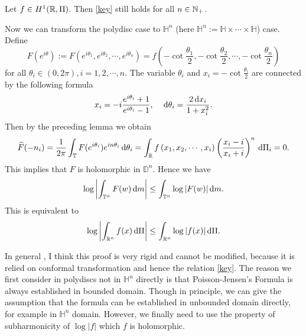 \begin{lemma}
	Let $f\in H^{1}(\mathbb{R},\Pi)$. Then \cref{key} still holds for all $n\in \mathbb{N}_{+}$.
\end{lemma}

Now we can transform the polydisc case to $\mathbb{H}^{n}$ (here $\mathbb{H}^{n}:=\mathbb{H}\times \cdots \times \mathbb{H} $) case. Define 
\[
F(e^{i \theta }):=F(e^{i\theta _1},e^{i\theta _2},\cdots ,e^{i\theta _n})=f\left( -\cot \frac{\theta_1}{2}, -\cot \frac{\theta_2}{2},\cdots ,-\cot \frac{\theta _n}{2} \right) 
\] 
for all $\theta _i \in  (0,2\pi),i=1,2,\cdots ,n$. The variable $\theta _i$ and $x_i=-\cot \frac{\theta_i}{2}$ are connected by the following formula
\[
x_i=-i \frac{e^{i\theta_i }+1}{e^{i\theta_i }-1},\quad \,\mathrm{d} \theta_i =\frac{2\,\mathrm{d} x_i}{1+x_i^2}.
\]
Then by the preceding lemma we obtain
\[
\widehat{F}(-n_{i})=\frac{1}{2\pi} \int_{\mathbb{T}}F(e^{i\theta _i})e^{i n\theta _i}\,\mathrm{d} \theta _i = \int_{\mathbb{R}}f\left( x_1,x_2,\cdots ,x_i \right) \left( \frac{x_i-i}{x_i+i} \right) ^{n}\,\mathrm{d} \Pi_i=0.
\]
This implies that $F$ is holomorphic in $\mathbb{D}^{n}$. Hence we have
\[
\log \left| \int_{\mathbb{T}^{n}}F(w)\,\mathrm{d} m \right|\le \int_{\mathbb{T}^{n}}\log|F(w)|\,\mathrm{d} m. 
\]
This is equivalent to 
\begin{equation}
	\log \left| \int_{\mathbb{R}^{n}}f(x)\,\mathrm{d}\Pi \right|\le \int_{\mathbb{R}^{n}} \log|f(x)|\,\mathrm{d} \Pi. 
\end{equation}

In general , I think this proof is very rigid and cannot be modified, because it is relied on conformal transformation and hence the relation \cref{key}. The reason we first consider in polydiscs not in $\mathbb{H}^{n}$ directly is that Poisson-Jensen's Formula is always established in bounded domain. Though in principle, we can give the assumption that the formula can be established in unbounded domain directly, for example in $\mathbb{H}^{n}$ domain. However, we finally need to use the property of subharmonicity of $\log|f|$ which $f$ is holomorphic.


